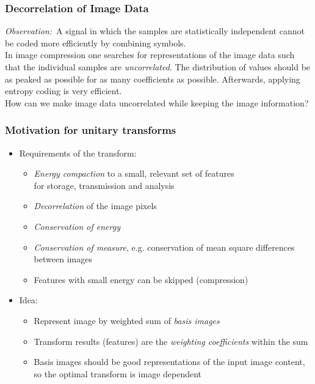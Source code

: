 \documentclass{beamer}
\begin{document}
\begin{frame}
\frametitle{Decorrelation of Image Data}
\textit{Observation:}\ A signal in which the samples are statistically 
independent cannot be coded more efficiently by combining symbols. 
\\[6pt]

In image compression one searches for representations of the image 
data such that the individual samples are \textit{uncorrelated}. The 
distribution of values should be as peaked as possible for as many 
coefficients as possible. Afterwards, applying entropy coding is very efficient. 
\\[6pt]

How can we make image data uncorrelated while keeping the 
image information?
\end{frame}

\begin{frame}
  \frametitle{Motivation for unitary transforms}
  
  \begin{itemize}
  \item Requirements of the transform:
    \begin{itemize}
    \item \textit{Energy compaction} to a small, relevant set of features \\
      for storage, transmission and analysis
    \item \textit{Decorrelation} of the image pixels
    \item \textit{Conservation of energy}
    \item \textit{Conservation of measure}, e.g. conservation of mean square differences between images 
    \item Features with small energy can be skipped (compression)
    \end{itemize}
  \item Idea:
    \begin{itemize}
    \item Represent image by weighted sum of \textit{basis images}
    \item Transform results (features) are the \textit{weighting coefficients} within the sum
    \item Basis images should be good representations of the input image
      content, so the optimal transform is image dependent
    \end{itemize}	
  \end{itemize}
\end{frame}
\end{document}
